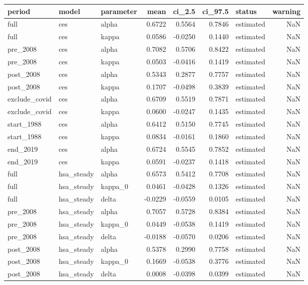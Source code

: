 \begin{tabular}{lllrrrlr}
\toprule
period & model & parameter & mean & ci\_2.5 & ci\_97.5 & status & warning \\
\midrule
full & ces & alpha & 0.6722 & 0.5564 & 0.7846 & estimated & NaN \\
full & ces & kappa & 0.0586 & -0.0250 & 0.1440 & estimated & NaN \\
pre\_2008 & ces & alpha & 0.7082 & 0.5706 & 0.8422 & estimated & NaN \\
pre\_2008 & ces & kappa & 0.0503 & -0.0416 & 0.1419 & estimated & NaN \\
post\_2008 & ces & alpha & 0.5343 & 0.2877 & 0.7757 & estimated & NaN \\
post\_2008 & ces & kappa & 0.1707 & -0.0498 & 0.3839 & estimated & NaN \\
exclude\_covid & ces & alpha & 0.6709 & 0.5519 & 0.7871 & estimated & NaN \\
exclude\_covid & ces & kappa & 0.0600 & -0.0247 & 0.1435 & estimated & NaN \\
start\_1988 & ces & alpha & 0.6412 & 0.5150 & 0.7745 & estimated & NaN \\
start\_1988 & ces & kappa & 0.0834 & -0.0161 & 0.1860 & estimated & NaN \\
end\_2019 & ces & alpha & 0.6724 & 0.5545 & 0.7852 & estimated & NaN \\
end\_2019 & ces & kappa & 0.0591 & -0.0237 & 0.1418 & estimated & NaN \\
full & hsa\_steady & alpha & 0.6573 & 0.5412 & 0.7708 & estimated & NaN \\
full & hsa\_steady & kappa\_0 & 0.0461 & -0.0428 & 0.1326 & estimated & NaN \\
full & hsa\_steady & delta & -0.0229 & -0.0559 & 0.0105 & estimated & NaN \\
pre\_2008 & hsa\_steady & alpha & 0.7057 & 0.5728 & 0.8384 & estimated & NaN \\
pre\_2008 & hsa\_steady & kappa\_0 & 0.0449 & -0.0538 & 0.1419 & estimated & NaN \\
pre\_2008 & hsa\_steady & delta & -0.0188 & -0.0570 & 0.0206 & estimated & NaN \\
post\_2008 & hsa\_steady & alpha & 0.5378 & 0.2990 & 0.7758 & estimated & NaN \\
post\_2008 & hsa\_steady & kappa\_0 & 0.1669 & -0.0538 & 0.3776 & estimated & NaN \\
post\_2008 & hsa\_steady & delta & 0.0008 & -0.0398 & 0.0399 & estimated & NaN \\

\end{tabular}
